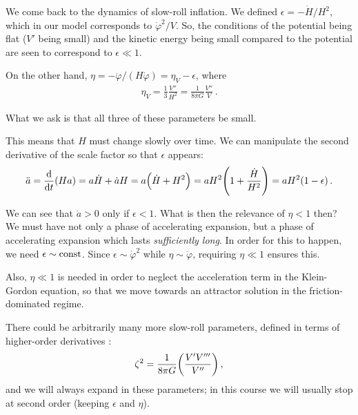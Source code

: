 \documentclass[main.tex]{subfiles}
\begin{document}

We come back to the dynamics of slow-roll inflation. 
We defined \(\epsilon = - \dot{H} / H^2 \), which in our model corresponds to \(\dot{\varphi}^2 / V \). 
So, the conditions of the potential being flat (\(V'\) being small) and the kinetic energy being small compared to the potential are seen to correspond to \(\epsilon \ll 1\). 

On the other hand, \(\eta = - \ddot{\varphi} / (H \dot{\varphi}) = \eta_V - \epsilon \), where 
%
\begin{align}
\eta _V = \frac{1}{3} \frac{V''}{H^2} = \frac{1}{8 \pi G} \frac{V''}{V}
\,.
\end{align}

What we ask is that all three of these parameters be small. 

This means that \(H\) must change slowly over time. 
We can manipulate the second derivative of the scale factor so that \(\epsilon \) appears:
%
\begin{align}
\ddot{a} = \dv{}{t} \qty(Ha) = a \dot{H} + \dot{a} H  = a \qty(\dot{H} + H^2) = a H^2 \qty(1 + \frac{\dot{H}}{H^2}) = a H^2 \qty(1 - \epsilon )
\,.
\end{align}

We can see that \(\ddot{a} > 0\) only if \(\epsilon < 1\). 
What is then the relevance of \(\eta < 1\) then? 
We must have not only a phase of accelerating expansion, but a phase of accelerating expansion which lasts \emph{sufficiently long}.
In order for this to happen, we need \(\epsilon \sim \text{const}\). Since \(\epsilon \sim \dot{\varphi}^2\) while \(\eta \sim \ddot{\varphi}\), requiring \(\eta \ll 1\) ensures this. 

Also, \(\eta \ll 1\) is needed in order to neglect the acceleration term in the Klein-Gordon equation, so that we move towards an attractor solution in the friction-dominated regime. 

There could be arbitrarily many more slow-roll parameters, defined in terms of higher-order derivatives \cite[pag.\ 406]{GravitationalWavesInflation2016}: 
%
\begin{align}
\zeta ^2 = \frac{1}{8 \pi G} \qty(\frac{V' V'''}{V''})
\,,
\end{align}
%
and we will always expand in these parameters; in this course we will usually stop at second order (keeping \(\epsilon \) and \(\eta \)).
\end{document}
